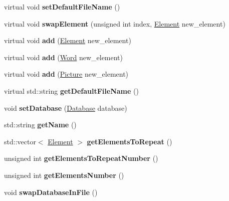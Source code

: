 \begin{DoxyCompactItemize}
virtual void {\bfseries set\+Default\+File\+Name} ()
\item 
\mbox{\label{class_elements_database_a9d070e57b36bd6b95de4fedca69e65de}} 
virtual void {\bfseries swap\+Element} (unsigned int index, \mbox{\hyperlink{class_element}{Element}} new\+\_\+element)
\item 
\mbox{\label{class_elements_database_a8bcf9ebeb58a89edb19b4c50fbd8ac3b}} 
virtual void {\bfseries add} (\mbox{\hyperlink{class_element}{Element}} new\+\_\+element)
\item 
\mbox{\label{class_elements_database_a28cf4791a1fc0f646b6e3d1d2ccf8c2a}} 
virtual void {\bfseries add} (\mbox{\hyperlink{class_word}{Word}} new\+\_\+element)
\item 
\mbox{\label{class_elements_database_acf20ca4257fd66261f2e786a6de10fd9}} 
virtual void {\bfseries add} (\mbox{\hyperlink{class_picture}{Picture}} new\+\_\+element)
\item 
\mbox{\label{class_elements_database_a37ffe633a79cf0aa5a30e70fba6945d5}} 
virtual std\+::string {\bfseries get\+Default\+File\+Name} ()
\item 
\mbox{\label{class_elements_database_ad8f7416174860a5512c6c648d75f65e1}} 
void {\bfseries set\+Database} (\mbox{\hyperlink{class_database}{Database}} database)
\item 
\mbox{\label{class_elements_database_aef7a58c83877e3eadb67993421c08759}} 
std\+::string {\bfseries get\+Name} ()
\item 
\mbox{\label{class_elements_database_a20e9f2279cd9dad94452b011b3a95193}} 
std\+::vector$<$ \mbox{\hyperlink{class_element}{Element}} $>$ {\bfseries get\+Elements\+To\+Repeat} ()
\item 
\mbox{\label{class_elements_database_aa1580aca3adde71f44987e71b262e031}} 
unsigned int {\bfseries get\+Elements\+To\+Repeat\+Number} ()
\item 
\mbox{\label{class_elements_database_abaddac9b4d310335ea2b0736eed31471}} 
unsigned int {\bfseries get\+Elements\+Number} ()
\item 
\mbox{\label{class_elements_database_a911115f8c466c6b4992d6df83182cbb2}} 
void {\bfseries swap\+Database\+In\+File} ()
\end{DoxyCompactItemize}
